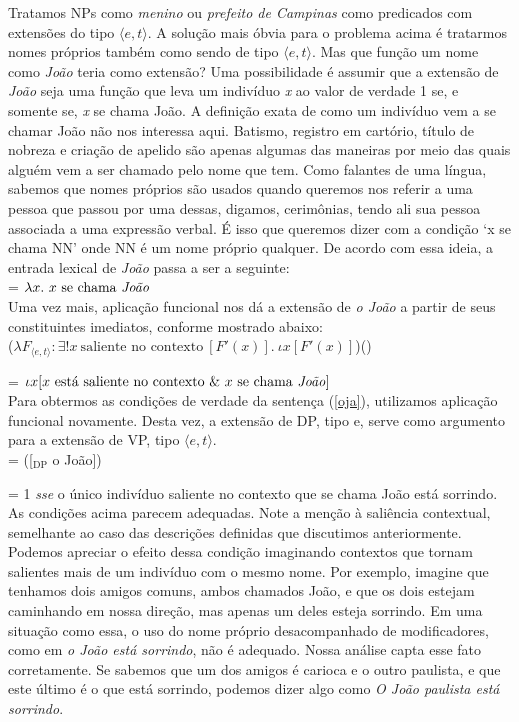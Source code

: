 Tratamos NPs como \textit{menino} ou \textit{prefeito de Campinas} como
predicados com extensões do tipo $\langle e,t \rangle$. A solução
mais óbvia para o problema acima é tratarmos nomes próprios também
como sendo de tipo $\langle e,t \rangle$. Mas que função um nome
como \textit{João} teria como extensão? Uma possibilidade é assumir que a
extensão de \textit{João} seja uma função que leva um indivíduo
\textit{x} ao valor de verdade 1 se, e somente se, \textit{x} se
chama João. A definição exata de como um indivíduo vem a se
chamar João não nos interessa aqui. Batismo, registro em cartório,
título de nobreza e criação de apelido são apenas algumas das
maneiras por meio das quais alguém vem a ser chamado pelo nome que
tem. Como falantes de uma língua, sabemos que nomes próprios são
usados quando queremos nos referir a uma pessoa que passou por uma
dessas, digamos, cerimônias, tendo ali sua pessoa associada a uma
expressão verbal. É isso que queremos dizer com a condição `x se
chama NN' onde NN é um nome próprio qualquer. De acordo com essa
ideia, a entrada lexical de \textit{João} passa a ser a seguinte:\\

\n {} = $\lambda x.\ x\ \text{se chama
\textit{João}}$\\

\n Uma vez mais, aplicação funcional nos dá a extensão de \textit{o João} a partir de seus constituintes imediatos, conforme mostrado abaixo:\\

\n ($\lambda F_{\langle e,t\rangle}:\exists !x\ \text{saliente no
contexto}\ [F'(x)].\ \iota x[F'(x)]$)()

\n = $\iota x[x\ \text{está saliente no contexto}\ \&\ x\ \text{se
chama \textit{João}}]$\\

\n Para obtermos as condições de verdade da sentença (\ref{oja}),
utilizamos aplicação funcional novamente. Desta vez, a extensão de
DP, tipo e, serve como argumento para a extensão de VP, tipo
$\langle e,t\rangle$.\\

\n {} = ([$_{\text{DP}}$ o
João])

\n = 1 \textit{sse} o único indivíduo saliente no contexto que se
chama João está sorrindo.\\

\n As condições acima parecem adequadas. Note a menção à saliência
contextual, semelhante ao caso das descrições definidas que
discutimos anteriormente. Podemos apreciar o efeito dessa condição
imaginando contextos que tornam salientes mais de um indivíduo com
o mesmo nome. Por exemplo, imagine que tenhamos dois amigos
comuns, ambos chamados João, e que os dois estejam caminhando em
nossa direção, mas apenas um deles esteja sorrindo. Em uma
situação como essa, o uso do nome próprio desacompanhado de
modificadores, como em \textit{o João está sorrindo}, não é adequado.
Nossa análise capta esse fato corretamente. Se sabemos que um
dos amigos é carioca e o outro paulista, e que este último é o que
está sorrindo, podemos dizer algo como \textit{O João paulista está
sorrindo}.

